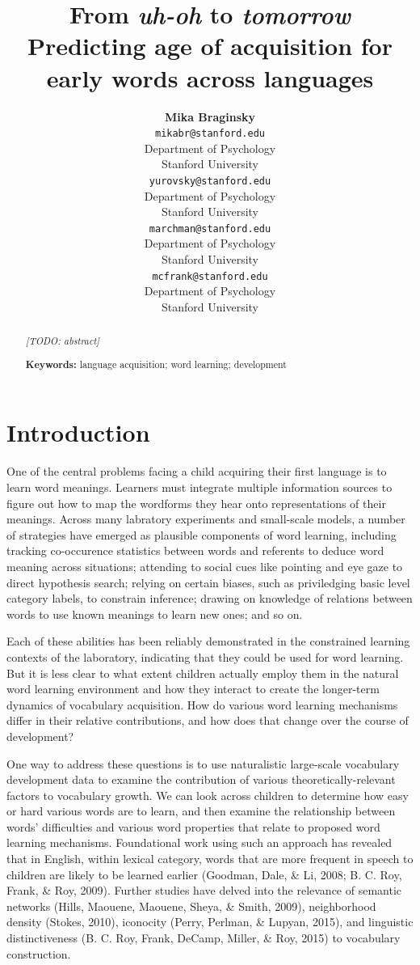 \documentclass[10pt, letterpaper]{article}
\title{From \emph{uh-oh} to \emph{tomorrow}\\Predicting age of acquisition for
early words across languages}
\author{{\large \bf Mika Braginsky} \\ \texttt{mikabr@stanford.edu} \\ Department of Psychology \\ Stanford University \And {\large \bf Daniel Yurovsky} \\ \texttt{yurovsky@stanford.edu} \\ Department of Psychology \\ Stanford University \And {\large \bf Virginia A. Marchman} \\ \texttt{marchman@stanford.edu} \\ Department of Psychology \\ Stanford University \And {\large \bf Michael C. Frank} \\ \texttt{mcfrank@stanford.edu} \\ Department of Psychology \\ Stanford University}
\begin{document}
\maketitle

\begin{abstract}
\emph{{[}TODO: abstract{]}}

\textbf{Keywords:}
language acquisition; word learning; development
\end{abstract}

\section{Introduction}\label{introduction}

One of the central problems facing a child acquiring their first
language is to learn word meanings. Learners must integrate multiple
information sources to figure out how to map the wordforms they hear
onto representations of their meanings. Across many labratory
experiments and small-scale models, a number of strategies have emerged
as plausible components of word learning, including tracking
co-occurence statistics between words and referents to deduce word
meaning across situations; attending to social cues like pointing and
eye gaze to direct hypothesis search; relying on certain biases, such as
priviledging basic level category labels, to constrain inference;
drawing on knowledge of relations between words to use known meanings to
learn new ones; and so on.

Each of these abilities has been reliably demonstrated in the
constrained learning contexts of the laboratory, indicating that they
could be used for word learning. But it is less clear to what extent
children actually employ them in the natural word learning environment
and how they interact to create the longer-term dynamics of vocabulary
acquisition. How do various word learning mechanisms differ in their
relative contributions, and how does that change over the course of
development?

One way to address these questions is to use naturalistic large-scale
vocabulary development data to examine the contribution of various
theoretically-relevant factors to vocabulary growth. We can look across
children to determine how easy or hard various words are to learn, and
then examine the relationship between words' difficulties and various
word properties that relate to proposed word learning mechanisms.
Foundational work using such an approach has revealed that in English,
within lexical category, words that are more frequent in speech to
children are likely to be learned earlier (Goodman, Dale, \& Li, 2008;
B. C. Roy, Frank, \& Roy, 2009). Further studies have delved into the
relevance of semantic networks (Hills, Maouene, Maouene, Sheya, \&
Smith, 2009), neighborhood density (Stokes, 2010), iconocity (Perry,
Perlman, \& Lupyan, 2015), and linguistic distinctiveness (B. C. Roy,
Frank, DeCamp, Miller, \& Roy, 2015) to vocabulary construction.
\end{document}
